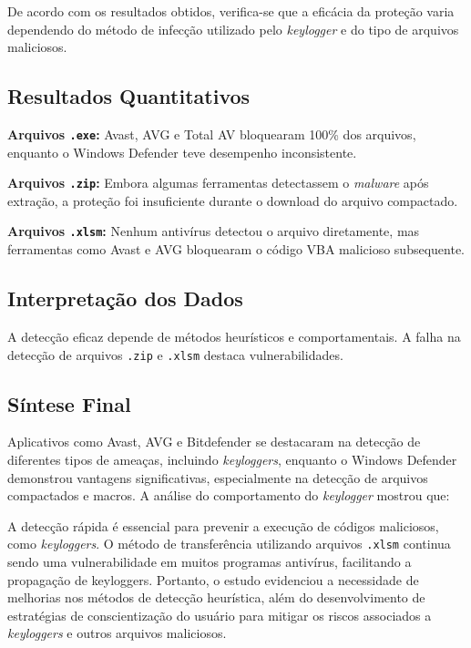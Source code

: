 \documentclass[12pt]{article}
\begin{document}
De acordo com os resultados obtidos, verifica-se que a eficácia da proteção varia dependendo do método de infecção utilizado pelo \textit{keylogger} e do tipo de arquivos maliciosos.

\subsection*{Resultados Quantitativos}
\textbf{Arquivos \texttt{.exe}:} Avast, AVG e Total AV bloquearam 100\% dos arquivos, enquanto o Windows Defender teve desempenho inconsistente.

\textbf{Arquivos \texttt{.zip}:} Embora algumas ferramentas detectassem o \textit{malware} após extração, a proteção foi insuficiente durante o download do arquivo compactado.

\textbf{Arquivos \texttt{.xlsm}:} Nenhum antivírus detectou o arquivo diretamente, mas ferramentas como Avast e AVG bloquearam o código VBA malicioso subsequente.

\subsection*{Interpretação dos Dados}
A detecção eficaz depende de métodos heurísticos e comportamentais. A falha na detecção de arquivos \texttt{.zip} e \texttt{.xlsm} destaca vulnerabilidades.

\subsection*{Síntese Final}
Aplicativos como Avast, AVG e Bitdefender se destacaram na detecção de diferentes tipos de ameaças, incluindo \textit{keyloggers}, enquanto o Windows Defender demonstrou vantagens significativas, especialmente na detecção de arquivos compactados e macros. A análise do comportamento do \textit{keylogger} mostrou que:

A detecção rápida é essencial para prevenir a execução de códigos maliciosos, como \textit{keyloggers}.
O método de transferência utilizando arquivos \texttt{.xlsm} continua sendo uma vulnerabilidade em muitos programas antivírus, facilitando a propagação de keyloggers.
Portanto, o estudo evidenciou a necessidade de melhorias nos métodos de detecção heurística, além do desenvolvimento de estratégias de conscientização do usuário para mitigar os riscos associados a \textit{keyloggers} e outros arquivos maliciosos.





\end{document}
